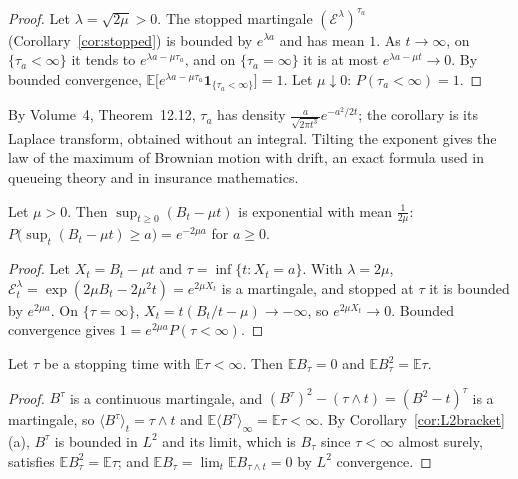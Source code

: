 \begin{proof}
Let $\lambda=\sqrt{2\mu}>0$. The stopped martingale $(\mathcal E^\lambda)^{\tau_a}$ (Corollary~\ref{cor:stopped}) is bounded by $e^{\lambda a}$ and has mean $1$. As $t\to\infty$, on $\{\tau_a<\infty\}$ it tends to
$e^{\lambda a-\mu\tau_a}$, and on $\{\tau_a=\infty\}$ it is at most $e^{\lambda a-\mu t}\to0$. By bounded convergence, $\mathbb E\bigl[e^{\lambda a-\mu\tau_a}\mathbf 1_{\{\tau_a<\infty\}}\bigr]=1$. Let $\mu\downarrow0$:
$P(\tau_a<\infty)=1$.
\end{proof}

By Volume~4, Theorem~12.12, $\tau_a$ has density $\frac{a}{\sqrt{2\pi t^3}}e^{-a^2/2t}$; the corollary is its Laplace transform, obtained without an integral. Tilting the exponent gives the law of the
maximum of Brownian motion with drift, an exact formula used in queueing theory and in insurance mathematics.

\begin{corollary}\label{cor:driftmax}
Let $\mu>0$. Then $\sup_{t\ge0}(B_t-\mu t)$ is exponential with mean $\frac1{2\mu}$: $P\bigl(\sup_t(B_t-\mu t)\ge a\bigr)=e^{-2\mu a}$ for $a\ge0$.
\end{corollary}

\begin{proof}
Let $X_t=B_t-\mu t$ and $\tau=\inf\{t:X_t=a\}$. With $\lambda=2\mu$, $\mathcal E^{\lambda}_t=\exp(2\mu B_t-2\mu^2t)=e^{2\mu X_t}$ is a martingale, and stopped at $\tau$ it is bounded by $e^{2\mu a}$. On $\{\tau=\infty\}$,
$X_t=t(B_t/t-\mu)\to-\infty$, so $e^{2\mu X_t}\to0$. Bounded convergence gives $1=e^{2\mu a}P(\tau<\infty)$.
\end{proof}

\begin{proposition}\label{prop:wald}
Let $\tau$ be a stopping time with $\mathbb E\tau<\infty$. Then $\mathbb EB_\tau=0$ and $\mathbb EB_\tau^2=\mathbb E\tau$.
\end{proposition}

\begin{proof}
$B^\tau$ is a continuous martingale, and $(B^\tau)^2-(\tau\wedge t)=(B^2-t)^\tau$ is a martingale, so $\langle B^\tau\rangle_t=\tau\wedge t$ and $\mathbb E\langle B^\tau\rangle_\infty=\mathbb E\tau<\infty$. By
Corollary~\ref{cor:L2bracket}(a), $B^\tau$ is bounded in $L^2$ and its limit, which is $B_\tau$ since $\tau<\infty$ almost surely, satisfies $\mathbb EB_\tau^2=\mathbb E\tau$; and
$\mathbb EB_\tau=\lim_t\mathbb EB_{\tau\wedge t}=0$ by $L^2$ convergence.
\end{proof}

